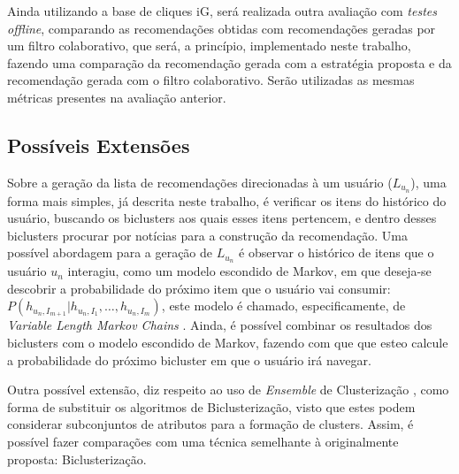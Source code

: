 \documentclass[
    12pt,                %
    oneside,            %
    a4paper,            %
    english,            %
    brazil                %
    ]{abntex2ppgsi}
\begin{document}
Ainda utilizando a base de cliques iG, será realizada outra avaliação com \textit{testes offline}, comparando as recomendações obtidas com recomendações geradas por um filtro colaborativo, que será, a princípio, implementado neste trabalho, fazendo uma comparação da recomendação gerada com a estratégia proposta e da recomendação gerada com o filtro colaborativo.
Serão utilizadas as mesmas métricas presentes na avaliação anterior.

\subsection{Possíveis Extensões}

Sobre a geração da lista de recomendações direcionadas à um usuário ($L_{u_n}$), uma forma mais simples, já descrita neste trabalho, é verificar os itens do histórico do usuário, buscando os biclusters aos quais esses itens pertencem, e dentro desses biclusters procurar por notícias para a construção da recomendação.
Uma possível abordagem para a geração de $L_{u_n}$ é observar o histórico de itens que o usuário $u_n$ interagiu, como um modelo escondido de Markov, em que deseja-se descobrir a probabilidade do próximo item que o usuário vai consumir: $P( h_{u_n,I_{m+1}} | h_{u_n,I_{1}},\dots,h_{u_n,I_{m}} )$, este modelo é chamado, especificamente, de \textit{Variable Length Markov Chains} \cite{Murphy2012}.
Ainda, é possível combinar os resultados dos biclusters com o modelo escondido de Markov, fazendo com que que esteo calcule a probabilidade do próximo bicluster em que o usuário irá navegar.

Outra possível extensão, diz respeito ao uso de \textit{Ensemble} de Clusterização \cite{Strehl2002}, como forma de substituir os algoritmos de Biclusterização, visto que estes podem considerar subconjuntos de atributos para a formação de clusters.
Assim, é possível fazer comparações com uma técnica semelhante à originalmente proposta: Biclusterização.

\postextual



%
%
\end{document}
